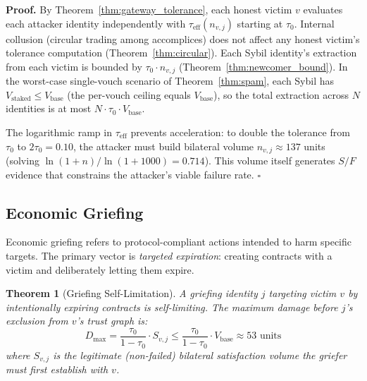 \documentclass[11pt]{article}
\newtheorem{theorem}{Theorem}[section]
\newcommand{\qed}{\hfill}
\newenvironment{proof}{\noindent\textbf{Proof.}}{\qed$\square$\par\medskip}
\begin{document}
\begin{proof}
By Theorem~\ref{thm:gateway_tolerance}, each honest victim $v$ evaluates each attacker identity independently with $\tau_{\text{eff}}(n_{v,j})$ starting at $\tau_0$. Internal collusion (circular trading among accomplices) does not affect any honest victim's tolerance computation (Theorem~\ref{thm:circular}). Each Sybil identity's extraction from each victim is bounded by $\tau_0 \cdot n_{v,j}$ (Theorem~\ref{thm:newcomer_bound}). In the worst-case single-vouch scenario of Theorem~\ref{thm:spam}, each Sybil has $V_{\text{staked}} \leq V_{\text{base}}$ (the per-vouch ceiling equals $V_{\text{base}}$), so the total extraction across $N$ identities is at most $N \cdot \tau_0 \cdot V_{\text{base}}$.

The logarithmic ramp in $\tau_{\text{eff}}$ prevents acceleration: to double the tolerance from $\tau_0$ to $2\tau_0 = 0.10$, the attacker must build bilateral volume $n_{v,j} \approx 137$ units (solving $\ln(1+n)/\ln(1+1000) = 0.714$). This volume itself generates $S/F$ evidence that constrains the attacker's viable failure rate. \qed
\end{proof}

\subsection{Economic Griefing}

Economic griefing refers to protocol-compliant actions intended to harm specific targets. The primary vector is \emph{targeted expiration}: creating contracts with a victim and deliberately letting them expire.

\begin{theorem}[Griefing Self-Limitation]\label{thm:griefing}
A griefing identity $j$ targeting victim $v$ by intentionally expiring contracts is self-limiting. The maximum damage before $j$'s exclusion from $v$'s trust graph is:
\begin{equation}
    D_{\text{max}} = \frac{\tau_0}{1 - \tau_0} \cdot S_{v,j} \leq \frac{\tau_0}{1 - \tau_0} \cdot V_{\text{base}} \approx 53 \text{ units}
\end{equation}
where $S_{v,j}$ is the legitimate (non-failed) bilateral satisfaction volume the griefer must first establish with $v$.
\end{theorem}
\end{document}
